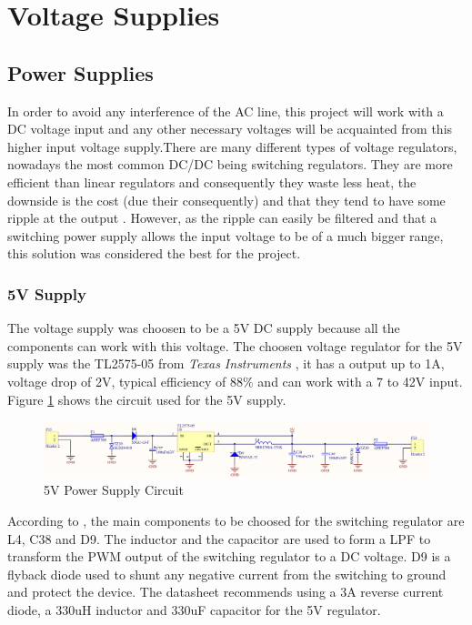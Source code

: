 \section{Voltage Supplies}\label{sec:voltage-supplies}

	\subsection{Power Supplies}\label{ssec:power-supplies}
		In order to avoid any interference of the AC line, this project will work with a DC voltage input and any other necessary voltages will be acquainted from this higher input voltage supply.There are many different types of voltage regulators, nowadays the most common DC/DC being switching regulators. They are more efficient than linear regulators and consequently they waste less heat, the downside is the cost (due their consequently) and that they tend to have some ripple at the output \cite{schweber2017}. However, as the ripple can easily be filtered and that a switching power supply allows the input voltage to be of a much bigger range, this solution was considered the best for the project. 

		\subsubsection{5V Supply}\label{sssec:5v-supply}
			The voltage supply was choosen to be a 5V DC supply because all the components can work with this voltage. The choosen voltage regulator for the 5V supply was the TL2575-05 from \textit{Texas Instruments} \cite{tl2575-05-datasheet}, it has a output up to 1A, voltage drop of 2V, typical efficiency of 88$\%$ and can work with a 7 to 42V input. Figure \ref{fig:tl2575-05-circuit} shows the circuit used for the 5V supply.

			\begin{figure}[htbp]
				\centering
					\includegraphics[scale=0.7]{figuras/fig-tl2575-05-circuit.png}
				\caption{5V Power Supply Circuit}
				\label{fig:tl2575-05-circuit}
			\end{figure}

			According to \cite{tl2575-05-datasheet}, the main components to be choosed for the switching regulator are L4, C38 and D9. The inductor and the capacitor are used to form a LPF to transform the PWM output of the switching regulator to a DC voltage. D9 is a flyback diode used to shunt any negative current from the switching to ground and protect the device. The datasheet recommends using a 3A reverse current diode, a 330uH inductor and 330uF capacitor for the 5V regulator.

